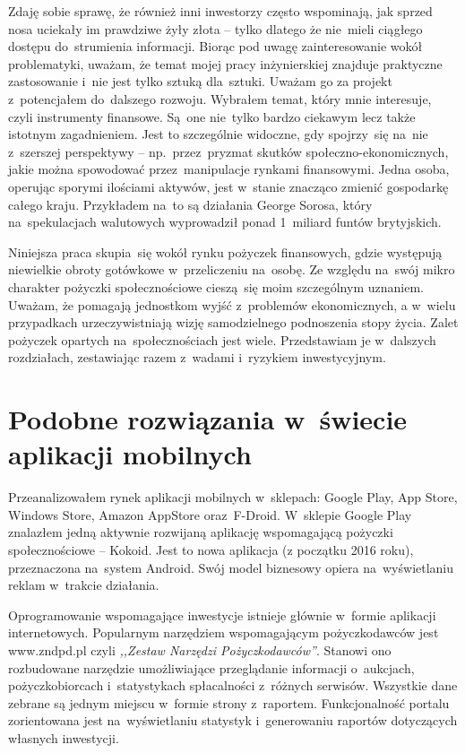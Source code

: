 \documentclass[a4paper,twoside,titlepage,openright]{book}
\begin{document}
Zdaję sobie sprawę, że również inni inwestorzy często wspominają, jak sprzed nosa uciekały im prawdziwe żyły złota -- tylko dlatego że nie~mieli ciągłego dostępu do~strumienia informacji. Biorąc pod uwagę zainteresowanie wokół problematyki, uważam, że temat mojej pracy inżynierskiej znajduje praktyczne zastosowanie i~nie jest tylko sztuką dla~sztuki. Uważam go za projekt z~potencjałem do~dalszego rozwoju. Wybrałem temat, który mnie interesuje, czyli instrumenty finansowe. Są~one nie~tylko bardzo ciekawym lecz także istotnym zagadnieniem. Jest to szczególnie widoczne, gdy spojrzy~się na~nie z~szerszej perspektywy -- np.~przez~pryzmat skutków społeczno-ekonomicznych, jakie można spowodować przez~manipulacje rynkami finansowymi. Jedna osoba, operując sporymi ilościami aktywów, jest w~stanie znacząco zmienić gospodarkę całego kraju. Przykładem na~to są działania George Sorosa, który na~spekulacjach walutowych wyprowadził ponad 1~miliard funtów brytyjskich.\cite{soros}

Niniejsza praca skupia~się wokół rynku pożyczek finansowych, gdzie występują niewielkie obroty gotówkowe w~przeliczeniu na~osobę. Ze względu na~swój mikro charakter pożyczki społecznościowe cieszą~się moim szczególnym uznaniem. Uważam, że pomagają jednostkom wyjść z~problemów ekonomicznych, a w~wielu przypadkach urzeczywistniają wizję samodzielnego podnoszenia stopy życia. Zalet pożyczek opartych na~społecznościach jest wiele. Przedstawiam je w~dalszych rozdziałach, zestawiając razem z~wadami i~ryzykiem inwestycyjnym.

\section*{Podobne rozwiązania w~świecie aplikacji mobilnych}

Przeanalizowałem rynek aplikacji mobilnych w~sklepach: Google Play, App Store, Windows Store, Amazon AppStore oraz~F-Droid. W~sklepie Google Play znalazłem jedną aktywnie rozwijaną aplikację wspomagającą pożyczki społecznościowe -- Kokoid. Jest to nowa aplikacja (z początku 2016 roku), przeznaczona na~system Android. Swój model biznesowy opiera na~wyświetlaniu reklam w~trakcie działania.

Oprogramowanie wspomagające inwestycje istnieje głównie w~formie aplikacji internetowych. Popularnym narzędziem wspomagającym pożyczkodawców jest www.zndpd.pl czyli \textit{,,Zestaw Narzędzi Pożyczkodawców''}. Stanowi ono rozbudowane narzędzie umożliwiające przeglądanie informacji o~aukcjach, pożyczkobiorcach i~statystykach spłacalności z~różnych serwisów. Wszystkie dane zebrane są jednym miejscu w~formie strony z~raportem. Funkcjonalność portalu zorientowana jest na~wyświetlaniu statystyk i~generowaniu raportów dotyczących własnych inwestycji.
\end{document}
